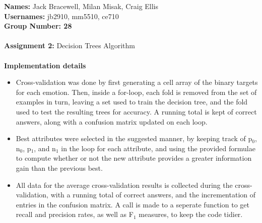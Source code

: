 \documentclass[12pt]{article}
\begin{document}
{\bf Names:} Jack Bracewell, Milan Misak, Craig Ellis \\
{\bf Usernames:} jb2910, mm5510, ce710 \\
{\bf Group Number: 28}  \\ \\

{\bf Assignment 2:} Decision Trees Algorithm \\ \\

{\bf Implementation details} \\
\begin{itemize}
  \item Cross-validation was done by first generating a cell array of the binary targets for each emotion. Then, inside a for-loop, each fold is removed from the set of examples in turn, leaving a set used to train the decision tree, and the fold used to test the resulting trees for accuracy. A running total is kept of correct answers, along with a confusion matrix updated on each loop.
  \item Best attributes were selected in the suggested manner, by keeping track of p$_{\textrm{0}}$, n$_{\textrm{0}}$, p$_{\textrm{1}}$, and n$_{\textrm{1}}$ in the loop for each attribute, and using the provided formulae to compute whether or not the new attribute provides a greater information gain than the previous best.
  \item All data for the average cross-validation results is collected during the cross-validation, with a running total of correct answers, and the incrementation of entries in the confusion matrix. A call is made to a seperate function to get recall and precision rates, as well as F$_{\textrm{1}}$ measures, to keep the code tidier.
\end{itemize}
\end{document}

